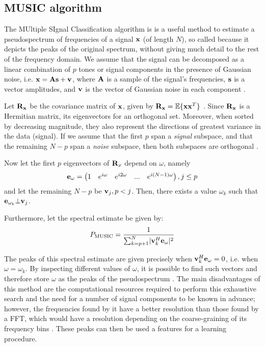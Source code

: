 \documentclass[../main.tex]{subfiles} \label{chapter_soa}
\begin{document}
\subsection{MUSIC algorithm} \label{subsection_music}
The MUltiple SIgnal Classification algorithm is is a useful method to estimate a pseudospectrum of frequencies of a signal $\mathbf{x}$ (of length $N$), so called because it depicts the peaks of the original spectrum, without giving much detail to the rest of the frequency domain. We assume that the signal can be decomposed as a linear combination of $p$ tones or signal components in the presence of Gaussian noise, i.e. $\mathbf{x} = \mathbf{As} + \mathbf{v}$, where $\mathbf{A}$ is a sample of the signal's frequencies, $\mathbf{s}$ is a vector amplitudes, and $\mathbf{v}$ is the vector of Gaussian noise in each component \cite{Evans}.
\par Let $\mathbf{R_x}$ be the covariance matrix of $\mathbf{x}$, given by $\mathbf{R_x} = \mathbb{E}\{\mathbf{xx}^T\}$ \cite{Evans}. Since $\mathbf{R_x}$ is a Hermitian matrix, its eigenvectors for an orthogonal set. Moreover, when sorted by decreasing magnitude, they also represent the directions of greatest variance in the data (signal). If we assume that the first $p$ span a \emph{signal} subspace, and that the remaining $N-p$ span a \emph{noise} subspace, then both subspaces are orthogonal \cite{Systems1989}. 
\par Now let the first $p$ eigenvectors of $\mathbf{R}_x$ depend on $\omega$, namely
\begin{align*}
\mathbf{e}_{\omega} = \begin{pmatrix}1&e^{i\omega}&e^{i2\omega}&...&e^{i(N-1)\omega}\end{pmatrix}, j \leq p
\end{align*}
and let the remaining $N-p$ be $\mathbf{v}_j, p < j$. Then, there exists a value $\omega_{k}$ such that $\mathbf{e}_{\omega_k}\bot\mathbf{v}_j$. 
\par Furthermore, let the spectral estimate \cite{Kootsookos1999, Mathworks2015} be given by:
\begin{align*}
P_\text{MUSIC} = \frac{1}{\sum_{k=p+1}^{N}\lvert\mathbf{v}_k^H\mathbf{e}_{\omega}\rvert^2}
\end{align*}
\par The peaks of this spectral estimate are given precisely when $\mathbf{v}_k^H\mathbf{e}_{\omega} = 0$, i.e. when $\omega = \omega_k$. By inspecting different values of $\omega$, it is possible to find such vectors and therefore store $\omega$ as the peaks of the pseudospectrum \cite{Delft2011}. The main disadvantages of this method are the computational resources required to perform this exhaustive search and the need for a number of signal components to be known in advance; however, the frequencies found by it have a better resolution than those found by a FFT, which would have a resolution depending on the coarse-graining of its frequency bins \cite{Kootsookos1999}. These peaks can then be used a features for a learning procedure.
\end{document}
